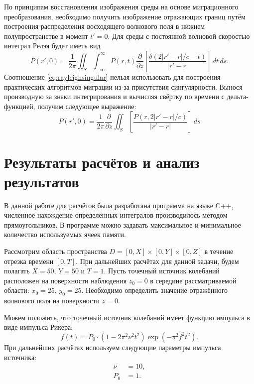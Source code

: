 \documentclass[a4paper, fontsize=14pt]{article}
\begin{document}
	По принципам восстановления изображения среды на основе миграционного преобразования, необходимо получить изображение отражающих границ путём построения распределения восходящего волнового поля в нижнем полупространстве в момент $t' = 0$. Для среды с постоянной волновой скоростью интеграл Релэя будет иметь вид
	\begin{equation}
		P(r',0) = \frac{1}{2\pi} \iint_S \int_{-\infty}^{\infty} P(r,t) \frac{\partial}{\partial z} 
		\left[ \frac{\delta(2|r'-r|/c -t)}{|r'-r|}\right]\,dt\,ds.
		\label{eq:rayleighsingular}
	\end{equation}
	Соотношение \eqref{eq:rayleighsingular} нельзя использовать для построения практических алгоритмов миграции из-за присутствия сингулярности. Вынося производную за знаки интегрирования и вычисляя свёртку по времени с дельта-функцией, получим следующее выражение\cite{golubev}:
	\begin{equation}
				P(r',0) = \frac{1}{2\pi}\frac{\partial}{\partial z} \iint_S   
		\left[ \frac{P(r,2|r'-r|/c)}{|r'-r|}\right]\,ds
		\label{eq:rayleighgood}
	\end{equation}
	

	\section{Результаты расчётов и анализ результатов}
	В данной работе для расчётов была разработана программа на языке C++, 
	численное нахождение определённых интегралов
	производилось методом прямоугольников. В программе можно задавать максимальное и минимальное количество используемых ячеек памяти.
	
	Рассмотрим область пространства $D = [0,X]\times [0,Y] \times [0,Z]$ в течение отрезка времени $[0,T]$. При дальнейших расчётах для данной задачи, будем полагать 
	$X = 50$, $Y=50$ и $T=1$. Пусть точечный источник колебаний расположен на поверхности наблюдения $z_0=0$ в середине рассматриваемой области: $x_0 = 25$, $y_0 = 25$. Необходимо определить значение отражённого волнового поля на поверхности $z=0$. 
	
	Можем положить, что точечный источник колебаний имеет функцию импульса в виде импульса Рикера:
	\begin{equation}
		f(t) = P_0 \cdot (1-2\pi^2 \nu^2 t^2)\exp(-\pi^2 f^2 t^2).
	\end{equation}
	При дальнейших расчётах используем следующие параметры импульса источника: 
	\begin{align*}
		\nu &=10, \\
		P_0 & = 1.
	\end{align*}
	
\end{document}
